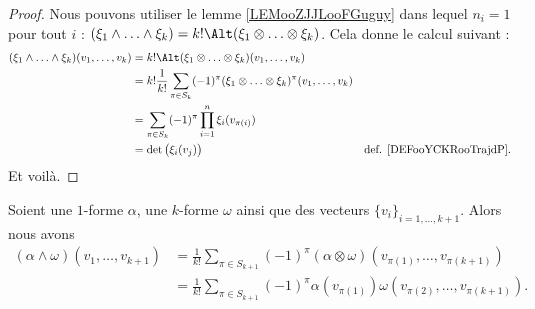 \begin{proof}
	Nous pouvons utiliser le lemme \ref{LEMooZJJLooFGuguy} dans lequel \( n_i=1\) pour tout \( i\) : \( (\xi_1\wedge\ldots\wedge \xi_k)=k!\Alt(\xi_1\otimes\ldots\otimes \xi_k)\). Cela donne le calcul suivant :
	\begin{subequations}
		\begin{align}
			(\xi_1\wedge\ldots\wedge \xi_k)(v_1,\ldots,v_k) & =k!\Alt(\xi_1\otimes\ldots\otimes\xi_k)(v_1,\ldots,v_k)                                                                                   \\
			                                                & =k!\frac{1}{ k!}\sum_{\pi\in S_k}(-1)^{\pi}(\xi_1\otimes\ldots\otimes \xi_k)^{\pi}(v_1,\ldots,v_k)                                        \\
			                                                & =\sum_{\pi\in S_k}(-1)^{\pi}\prod_{i=1}^n\xi_i(v_{\pi(i)})                                                                                \\
			                                                & =\det\big( \xi_i(v_j) \big)                                                                        & \text{def. \ref{DEFooYCKRooTrajdP}.}
		\end{align}
	\end{subequations}
	Et voilà.
\end{proof}

\begin{corollary}			\label{CORooDQSNooZtMuOJ}
	Soient une \( 1\)-forme \( \alpha\), une \( k\)-forme \( \omega\) ainsi que des vecteurs \( \{ v_i \}_{i=1,\ldots,k+1}\). Alors nous avons
	\begin{subequations}
		\begin{align}
			(\alpha\wedge \omega)(v_1,\ldots,v_{k+1}) & =\frac{1}{ k!}\sum_{\pi\in S_{k+1}}(-1)^{\pi}(\alpha\otimes \omega)(v_{\pi(1)},\ldots,v_{\pi(k+1)})     \label{SUBEQooTNYNooAeuhHJ}   \\
			                                          & =\frac{1}{ k!}\sum_{\pi\in S_{k+1}}(-1)^{\pi}\alpha(v_{\pi(1)})\omega(v_{\pi(2)},\ldots,v_{\pi(k+1)}).    \label{SUBEQooSNOTooZzxesM}
		\end{align}
	\end{subequations}
\end{corollary}

